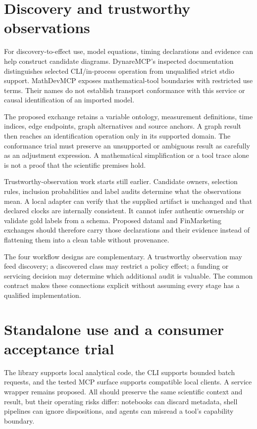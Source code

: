 \section{Discovery and trustworthy observations}

For discovery-to-effect use, model equations, timing declarations and evidence
can help construct candidate diagrams. DynareMCP's inspected documentation
distinguishes selected CLI/in-process operation from unqualified strict stdio
support. MathDevMCP exposes mathematical-tool boundaries with restricted use
terms.\cite{v12_in_inventory} Their names do not establish transport conformance
with this service or causal identification of an imported model.

The proposed exchange retains a variable ontology, measurement definitions,
time indices, edge endpoints, graph alternatives and source anchors. A graph
result then reaches an identification operation only in its supported domain.
The conformance trial must preserve an unsupported or ambiguous result as
carefully as an adjustment expression. A mathematical simplification or a
tool trace alone is not a proof that the scientific premises hold.

Trustworthy-observation work starts still earlier. Candidate owners, selection
rules, inclusion probabilities and label audits determine what the observations
mean. A local adapter can verify that the supplied artifact is unchanged and
that declared clocks are internally consistent. It cannot infer authentic
ownership or validate gold labels from a schema. Proposed dataml and
FinMarketing exchanges should therefore carry those declarations and their
evidence instead of flattening them into a clean table without provenance.

The four workflow designs are complementary. A trustworthy observation may
feed discovery; a discovered class may restrict a policy effect; a funding or
servicing decision may determine which additional audit is valuable. The
common contract makes these connections explicit without assuming every stage
has a qualified implementation.

\section{Standalone use and a consumer acceptance trial}

The library supports local analytical code, the CLI supports bounded batch
requests, and the tested MCP surface supports compatible local clients. A
service wrapper remains proposed. All should preserve the same scientific
context and result, but their operating risks differ: notebooks can discard
metadata, shell pipelines can ignore dispositions, and agents can misread a
tool's capability boundary.

